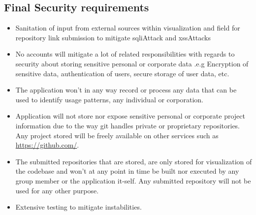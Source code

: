 \subsection{Final Security requirements}
\begin{itemize}
    \item Sanitation of input from external sources within visualization and field for repository link submission to mitigate \gls{sqliAttack} and \gls{xssAttack}s
    \item No accounts will mitigate a lot of related responsibilities with regards to security about storing sensitive personal or corporate data .e.g Encryption of sensitive data, authentication of users, secure storage of user data, etc.
    \item The application won't in any way record or process any data that can be used to identify usage patterns, any individual or corporation. 
    \item Application will not store nor expose sensitive personal or corporate project information due to the way \gls{git} handles private or \gls{proprietary} repositories. Any project stored will be freely available on other services such as \href{Github}{https://github.com/}.
    \item The submitted repositories that are stored, are only stored for visualization of the codebase and won't at any point in time be built nor executed by any group member or the application it-self. Any submitted repository will not be used for any other purpose.
    \item Extensive testing to mitigate instabilities.
\end{itemize}


